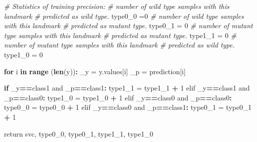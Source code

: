 \documentclass[10pt,letterpaper]{article}
\newenvironment{Shaded}{\begin{snugshade}}{\end{snugshade}}
\newcommand{\KeywordTok}[1]{\textcolor[rgb]{0.13,0.29,0.53}{\textbf{#1}}}
\newcommand{\DecValTok}[1]{\textcolor[rgb]{0.00,0.00,0.81}{#1}}
\newcommand{\StringTok}[1]{\textcolor[rgb]{0.31,0.60,0.02}{#1}}
\newcommand{\CommentTok}[1]{\textcolor[rgb]{0.56,0.35,0.01}{\textit{#1}}}
\newcommand{\ControlFlowTok}[1]{\textcolor[rgb]{0.13,0.29,0.53}{\textbf{#1}}}
\newcommand{\OperatorTok}[1]{\textcolor[rgb]{0.81,0.36,0.00}{\textbf{#1}}}
\newcommand{\NormalTok}[1]{#1}
\begin{document}
\begin{Shaded}
\begin{Highlighting}[]
    \CommentTok{# Statistics of training precision:}
    \CommentTok{# number of wild type samples with this landmark}
    \CommentTok{# predicted as wild type.}
\NormalTok{    type0_}\DecValTok{0}\NormalTok{ =}\DecValTok{0}
    \CommentTok{# number of wild type samples with this landmark}
    \CommentTok{# predicted as mutant type.}
\NormalTok{    type0_}\DecValTok{1}\NormalTok{ =}\StringTok{ }\DecValTok{0}
    \CommentTok{# number of mutant type samples with this landmark}
    \CommentTok{# predicted as mutant type.}
\NormalTok{    type1_}\DecValTok{1}\NormalTok{ =}\StringTok{ }\DecValTok{0}
    \CommentTok{# number of mutant type samples with this landmark}
    \CommentTok{# predicted as wild type.}
\NormalTok{    type1_}\DecValTok{0}\NormalTok{ =}\StringTok{ }\DecValTok{0}
    
    \ControlFlowTok{for}\NormalTok{ i }\ControlFlowTok{in} \KeywordTok{range}\NormalTok{ (}\KeywordTok{len}\NormalTok{(y))}\OperatorTok{:}
\StringTok{        }\NormalTok{_y =}\StringTok{ }\NormalTok{y.values[i]}
\NormalTok{        _p =}\StringTok{ }\NormalTok{prediction[i]}

        \ControlFlowTok{if}\NormalTok{ _y}\OperatorTok{==}\NormalTok{class1 and _p}\OperatorTok{==}\NormalTok{class1}\OperatorTok{:}
\StringTok{            }\NormalTok{type1_}\DecValTok{1}\NormalTok{ =}\StringTok{ }\NormalTok{type1_}\DecValTok{1} \OperatorTok{+}\StringTok{ }\DecValTok{1}
\NormalTok{        elif _y}\OperatorTok{==}\NormalTok{class1 and _p}\OperatorTok{==}\NormalTok{class0}\OperatorTok{:}
\StringTok{            }\NormalTok{type1_}\DecValTok{0}\NormalTok{ =}\StringTok{ }\NormalTok{type1_}\DecValTok{0} \OperatorTok{+}\StringTok{ }\DecValTok{1}
\NormalTok{        elif _y}\OperatorTok{==}\NormalTok{class0 and _p}\OperatorTok{==}\NormalTok{class0}\OperatorTok{:}
\StringTok{            }\NormalTok{type0_}\DecValTok{0}\NormalTok{ =}\StringTok{ }\NormalTok{type0_}\DecValTok{0} \OperatorTok{+}\StringTok{ }\DecValTok{1}
\NormalTok{        elif _y}\OperatorTok{==}\NormalTok{class0 and _p}\OperatorTok{==}\NormalTok{class1}\OperatorTok{:}
\StringTok{            }\NormalTok{type0_}\DecValTok{1}\NormalTok{ =}\StringTok{ }\NormalTok{type0_}\DecValTok{1} \OperatorTok{+}\StringTok{ }\DecValTok{1}
    
\NormalTok{    return svc, type0_}\DecValTok{0}\NormalTok{, type0_}\DecValTok{1}\NormalTok{, type1_}\DecValTok{1}\NormalTok{, type1_}\DecValTok{0}



\end{Highlighting}
\end{Shaded}
\end{document}

